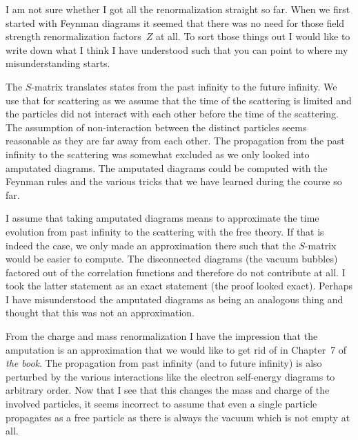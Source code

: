 \documentclass[11pt, english, fleqn, DIV=15, headinclude]{scrartcl}
\begin{document}
\begin{multicols}{2}
    I am not sure whether I got all the renormalization straight so far. When
    we first started with Feynman diagrams it seemed that there was no need for
    those field strength renormalization factors~$Z$ at all. To sort those
    things out I would like to write down what I think I have understood such
    that you can point to where my misunderstanding starts.

    The $S$-matrix translates states from the past infinity to the future
    infinity. We use that for scattering as we assume that the time of the
    scattering is limited and the particles did not interact with each other
    before the time of the scattering. The assumption of non-interaction
    between the distinct particles seems reasonable as they are far away from
    each other. The propagation from the past infinity to the scattering was
    somewhat excluded as we only looked into amputated diagrams. The amputated
    diagrams could be computed with the Feynman rules and the various tricks
    that we have learned during the course so far.

    I assume that taking amputated diagrams means to approximate the time
    evolution from past infinity to the scattering with the free theory. If
    that is indeed the case, we only made an approximation there such that the
    $S$-matrix would be easier to compute. The disconnected diagrams (the
    vacuum bubbles) factored out of the correlation functions and therefore do
    not contribute at all. I took the latter statement as an exact statement
    (the proof looked exact). Perhaps I have misunderstood the amputated
    diagrams as being an analogous thing and thought that this was not an
    approximation.

    From the charge and mass renormalization I have the impression that the
    amputation is an approximation that we would like to get rid of in
    Chapter~7 of \emph{the book}. The propagation from past infinity (and to
    future infinity) is also perturbed by the various interactions like the
    electron self-energy diagrams to arbitrary order. Now that I see that this
    changes the mass and charge of the involved particles, it seems incorrect
    to assume that even a single particle propagates as a free particle as
    there is always the vacuum which is not empty at all.


\end{multicols}
\end{document}
